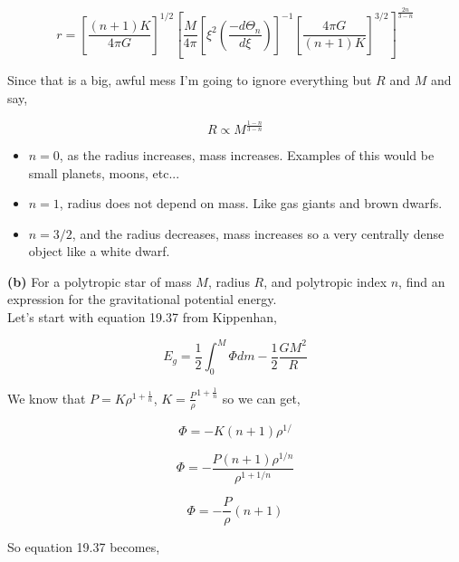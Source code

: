 \documentclass[12pt]{article}
\begin{document}
\begin{equation}
r = \left[ \frac{\left( n + 1 \right)K}{4\pi G} \right]^{1/2}\left[ \frac{M}{4\pi} \left[\xi^2\left( \frac{-d\Theta_n}{d\xi}\right) \right]^{-1} \left[ \frac{4\pi G}{\left( n + 1 \right) K} \right]^{3/2} \right]^{\frac{2n}{3-n}}
\end{equation}

\noindent Since that is a big, awful mess I'm going to ignore everything but $R$ and $M$ and say,

\begin{equation}
R \propto M^{\frac{1-n}{3-n}}
\end{equation}

\begin{itemize}
\item $n=0$, as the radius increases, mass increases. Examples of this would be small planets, moons, etc...
\item $n=1$, radius does not depend on mass. Like gas giants and brown dwarfs.
\item $n=3/2$, and the radius decreases, mass increases so a very centrally dense object like a white dwarf.
\end{itemize}

\noindent \textbf{(b)} For a polytropic star of mass $M$, radius $R$, and polytropic index $n$, find an expression for the gravitational potential energy. \\

\noindent Let's start with equation 19.37 from Kippenhan,

\begin{equation}
E_g = \frac{1}{2}\int^M_0 \Phi dm - \frac{1}{2}\frac{GM^2}{R}
\end{equation}
 
\noindent We know that $P=K\rho^{1+\frac{1}{n}}$, $K = \frac{P}{\rho}^{1 +\frac{1}{n}}$ so we can get,

\begin{equation}
\Phi = - K\left( n + 1 \right) \rho^{1/}
\end{equation}

\begin{equation}
\Phi = - \frac{P\left( n + 1 \right) \rho^{1/n}}{\rho^{1 + 1/n}}
\end{equation}

\begin{equation}
\Phi = -\frac{P}{\rho}\left( n + 1 \right)
\end{equation}

\noindent So equation 19.37 becomes,
\end{document}
